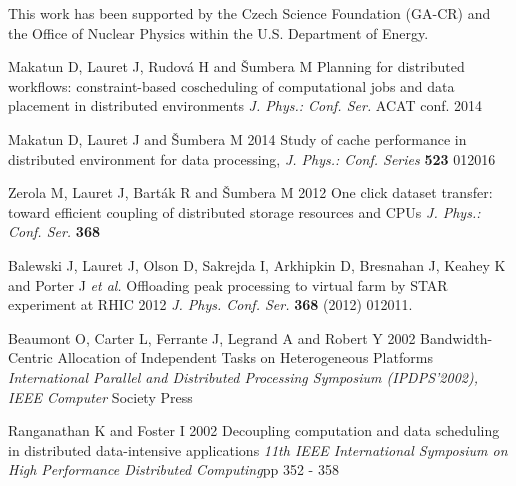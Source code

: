 \begin{acknowledgements}
This work has been supported by the Czech Science Foundation
(GA-CR)  and the Office of Nuclear Physics within the U.S.
Department of Energy.
\end{acknowledgements}


\begin{thebibliography}{}
%
%


Makatun D, Lauret J, Rudov\'a H and \v{S}umbera M
Planning for distributed workflows: constraint-based coscheduling of computational jobs and data placement in distributed environments \textit{J. Phys.: Conf. Ser.} ACAT conf. 2014

Makatun D, Lauret J and \v{S}umbera M 2014 Study of cache performance in distributed environment for data processing,  \textit{J. Phys.: Conf. Series} \textbf{523} 012016

 Zerola M, Lauret J, Bart\'ak R and \v{S}umbera M 2012
 One click dataset transfer: toward efficient coupling of distributed storage resources and CPUs  \textit{J. Phys.: Conf. Ser.} \textbf{368} 
 
  Balewski J, Lauret J, Olson D, Sakrejda I, Arkhipkin D, Bresnahan J, Keahey K and Porter J {\it et al.}
  Offloading peak processing to virtual farm by STAR experiment at RHIC 2012
  \textit{J. Phys. Conf. Ser.}  {\bf 368} (2012) 012011. 
 
Beaumont O, Carter L, Ferrante J, Legrand A and Robert Y 2002
Bandwidth-Centric Allocation of Independent Tasks on Heterogeneous Platforms
\textit{International Parallel and Distributed Processing Symposium (IPDPS’2002),  IEEE Computer} Society Press

Ranganathan K and Foster I 2002
Decoupling computation and data scheduling in distributed data-intensive applications
\textit{11th IEEE International Symposium on High Performance Distributed Computing}pp 352 - 358

\end{thebibliography}



